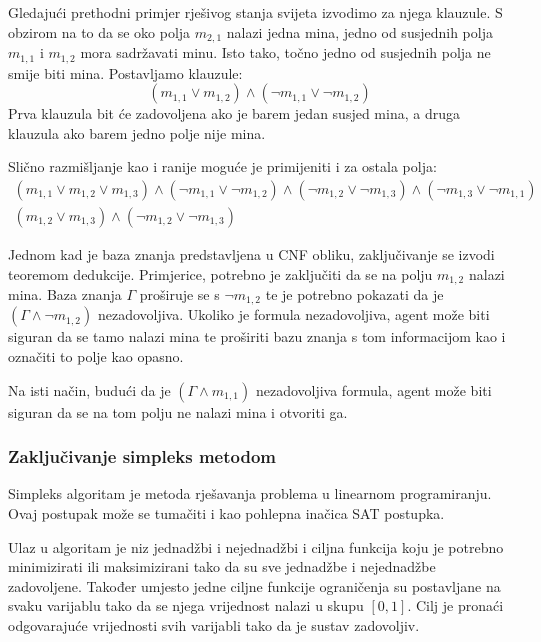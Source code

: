 \documentclass{article}
\begin{document}
Gledajući prethodni primjer rješivog stanja svijeta izvodimo za njega klauzule. 
S obzirom na to da se oko polja $m_{2, 1}$ nalazi jedna mina, jedno od susjednih polja $m_{1,1}$ i $m_{1, 2}$ mora sadržavati minu. Isto tako, točno jedno od susjednih polja ne smije biti mina. Postavljamo klauzule:
\begin{equation*}
    (m_{1, 1} \vee m_{1, 2}) \wedge (\neg m_{1, 1} \vee \neg m_{1, 2})
\end{equation*}
Prva klauzula bit će zadovoljena ako
je barem jedan susjed mina, a druga klauzula ako barem jedno polje nije mina.

Slično razmišljanje kao i ranije moguće je primijeniti i za ostala polja:
\begin{gather*}
    (m_{1, 1} \vee m_{1, 2} \vee m_{1, 3}) \wedge
        (\neg m_{1, 1} \vee \neg m_{1, 2}) \wedge
        (\neg m_{1, 2} \vee \neg m_{1, 3}) \wedge
        (\neg m_{1, 3} \vee \neg m_{1, 1}) \\
    (m_{1, 2} \vee m_{1, 3}) \wedge (\neg m_{1, 2} \vee \neg m_{1, 3})
\end{gather*}

Jednom kad je baza znanja predstavljena u CNF obliku, zaključivanje se izvodi teoremom dedukcije.
Primjerice, potrebno je zaključiti da se na polju $m_{1, 2}$ nalazi mina. Baza znanja $\Gamma$
proširuje se s $\neg m_{1, 2}$ te je potrebno pokazati da je $(\Gamma \wedge \neg m_{1, 2})$
nezadovoljiva. Ukoliko je formula nezadovoljiva, agent može biti siguran da se tamo nalazi mina te proširiti
bazu znanja s tom informacijom kao i označiti to polje kao opasno.

Na isti način, budući da je $(\Gamma \wedge m_{1, 1})$ nezadovoljiva formula, agent može biti siguran da se na tom polju ne nalazi mina i otvoriti ga. 


\subsubsection{Zaključivanje simpleks metodom}
Simpleks algoritam je metoda rješavanja problema u linearnom programiranju. Ovaj postupak može se
tumačiti i kao pohlepna inačica SAT postupka.

Ulaz u algoritam je niz jednadžbi i nejednadžbi i ciljna funkcija koju je potrebno minimizirati ili maksimizirani tako da su sve jednadžbe i nejednadžbe zadovoljene. Također umjesto jedne ciljne funkcije ograničenja su postavljane na svaku varijablu tako da se njega vrijednost nalazi u skupu $[0, 1]$. Cilj je pronaći odgovarajuće vrijednosti svih varijabli tako da je sustav zadovoljiv.
\end{document}
